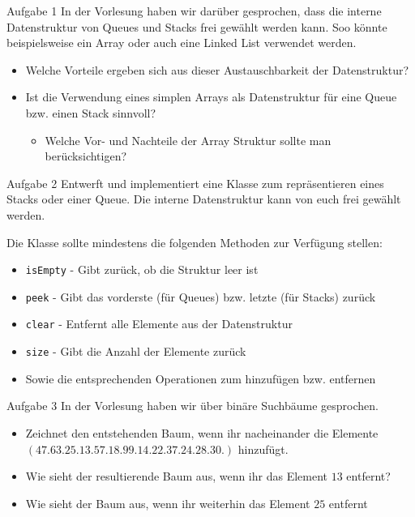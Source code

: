 \begin{frame}{Aufgabe 1}
In der Vorlesung haben wir darüber gesprochen, dass die interne Datenstruktur von Queues und Stacks frei gewählt werden kann. Soo könnte beispielsweise
ein Array oder auch eine Linked List verwendet werden.
	\begin{itemize}
		\item Welche Vorteile ergeben sich aus dieser Austauschbarkeit der Datenstruktur?
		\item Ist die Verwendung eines simplen Arrays als Datenstruktur für eine Queue bzw. einen Stack sinnvoll?
		\begin{itemize}
			\item Welche Vor- und Nachteile der Array Struktur sollte man berücksichtigen?
		\end{itemize}
	\end{itemize}
\end{frame}

\begin{frame}{Aufgabe 2}
Entwerft und implementiert eine Klasse zum repräsentieren eines Stacks oder einer Queue. Die interne Datenstruktur kann von euch frei gewählt werden.

Die Klasse sollte mindestens die folgenden Methoden zur Verfügung stellen:
\begin{itemize}
	\item \texttt{isEmpty} - Gibt zurück, ob die Struktur leer ist
	\item \texttt{peek} - Gibt das vorderste (für Queues) bzw. letzte (für Stacks) zurück
	\item \texttt{clear} - Entfernt alle Elemente aus der Datenstruktur
	\item \texttt{size} - Gibt die Anzahl der Elemente zurück
	\item Sowie die entsprechenden Operationen zum hinzufügen bzw. entfernen
\end{itemize}
\end{frame}

\begin{frame}{Aufgabe 3}
In der Vorlesung haben wir über binäre Suchbäume gesprochen. 
	\begin{itemize}
		\item Zeichnet den entstehenden Baum, wenn ihr nacheinander die Elemente $(47. 63. 25. 13. 57. 18. 99. 14. 22. 37. 24. 28. 30.)$ hinzufügt.
		\item Wie sieht der resultierende Baum aus, wenn ihr das Element $13$ entfernt?
		\item Wie sieht der Baum aus, wenn ihr weiterhin das Element $25$ entfernt
	\end{itemize}
\end{frame}

